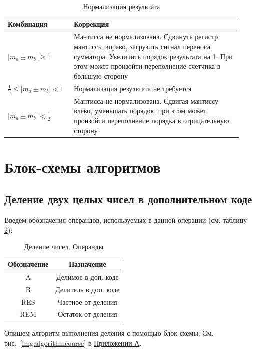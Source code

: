 \documentclass[a4paper,14pt]{extarticle}
\begin{document}
\begin{table}[h!]
	\small
	\begin{tabular}{|m{0.25\linewidth}|m{0.68\linewidth}|}
		\hline
		\textbf{Комбинация} &\textbf{Коррекция}\\
		\hline
		$\left|m_a\pm m_b\right|\ge1$ & Мантисса не нормализована. Сдвинуть регистр мантиссы вправо, загрузить сигнал переноса сумматора. Увеличить порядок результата на 1. При этом может произойти переполнение счетчика в большую сторону \\ 
		\hline
		$\frac12\le \left|m_a\pm m_b\right|< 1$ & Нормализация результата не требуется\\
		\hline
		$\left|m_a\pm m_b\right|<\frac12$ & Мантисса не нормализована. Сдвигая мантиссу влево, уменьшать порядок, при этом может произойти переполнение порядка в отрицательную сторону\\
		\hline
	\end{tabular}
	\caption{Нормализация результата}
	\label{tab:correction5}
\end{table}


\section{Блок-схемы алгоритмов}
\subsection{Деление двух целых чисел в дополнительном коде}
Введем обозначения операндов, используемых в данной операции (см. таблицу \ref{tab:vars}):
\begin{table}[h!]
	\small
	\centering
	\begin{tabular}{|c|c|}
		\hline
		\multicolumn{1}{|c|}{\textbf{Обозначение}} & \multicolumn{1}{c|}{\textbf{Назначение}} \\ \hline
		A & Делимое в доп. коде \\ \hline
		B & Делитель в доп. коде \\ \hline
		RES & Частное от деления \\ \hline
		REM & Остаток от деления \\ \hline
	\end{tabular}
	\caption{Деление чисел. Операнды}
	\label{tab:vars}

\end{table} 

Опишем алгоритм выполнения деления  с помощью блок схемы.  См. рис.~\ref{img:algorithmcourse} в \hyperref[tam]{Приложении А}.
\end{document}
